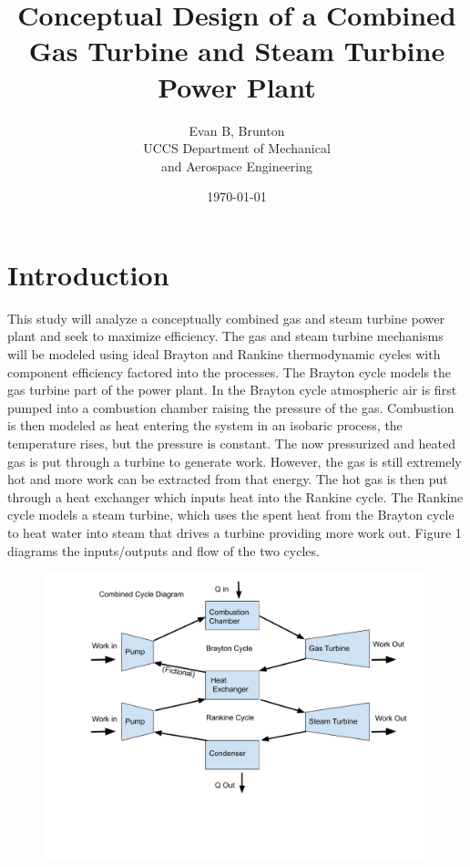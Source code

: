 \documentclass{article}
\title{Conceptual Design of a Combined Gas Turbine and Steam Turbine Power Plant}
\date{\today}
\author{Evan B, Brunton\\[2ex]
    UCCS Department of Mechanical\\
    and Aerospace Engineering
}
\begin{document}
\maketitle

\section{Introduction}

    This study will analyze a conceptually combined gas and steam turbine power plant and seek to maximize efficiency. The gas and steam turbine mechanisms will be modeled using ideal Brayton and Rankine thermodynamic cycles with component efficiency factored into the processes. The Brayton cycle models the gas turbine part of the power plant. In the Brayton cycle atmospheric air is first pumped into a combustion chamber raising the pressure of the gas. Combustion is then modeled as heat entering the system in an isobaric process, the temperature rises, but the pressure is constant. The now pressurized and heated gas is put through a turbine to generate work. However, the gas is still extremely hot and more work can be extracted from that energy. The hot gas is then put through a heat exchanger which inputs heat into the Rankine cycle. The Rankine cycle models a steam turbine, which uses the spent heat from the Brayton cycle to heat water into steam that drives a turbine providing more work out. Figure 1 diagrams the inputs/outputs and flow of the two cycles.
    
\begin{figure}[!htbp]
\centering
  \includegraphics[page=1,trim=10mm 40mm 10mm 0mm,clip,width=0.99\textwidth]{Combined Cycle Diagram (1).pdf}
  \caption{}
  \label{fig:epsfig}
\end{figure}
\end{document}
